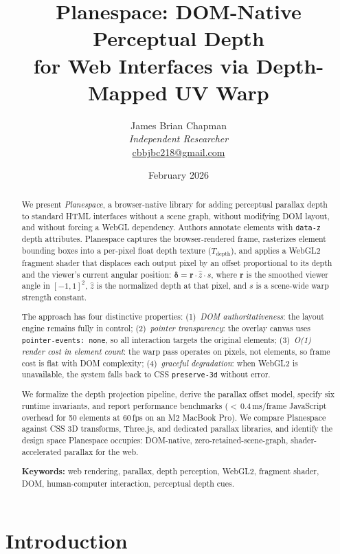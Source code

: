 \documentclass[10pt,twocolumn]{article}
\title{\textbf{Planespace: DOM-Native Perceptual Depth\\
for Web Interfaces via Depth-Mapped UV Warp}}
\author{
  James Brian Chapman\\
  \textit{Independent Researcher}\\
  \href{mailto:cbbjbc218@gmail.com}{cbbjbc218@gmail.com}
}
\date{February 2026}
\begin{document}
\maketitle

\begin{abstract}
We present \emph{Planespace}, a browser-native library for adding perceptual
parallax depth to standard HTML interfaces without a scene graph, without
modifying DOM layout, and without forcing a WebGL dependency.
Authors annotate elements with \texttt{data-z} depth attributes.
Planespace captures the browser-rendered frame, rasterizes element bounding
boxes into a per-pixel float depth texture ($T_{\mathrm{depth}}$), and applies
a WebGL2 fragment shader that displaces each output pixel by an offset
proportional to its depth and the viewer's current angular position:
$\boldsymbol{\delta} = \mathbf{r} \cdot \hat{z} \cdot s$, where
$\mathbf{r}$ is the smoothed viewer angle in $[-1,1]^2$, $\hat{z}$ is the
normalized depth at that pixel, and $s$ is a scene-wide warp strength constant.

The approach has four distinctive properties:
(1)~\emph{DOM authoritativeness}: the layout engine remains fully in control;
(2)~\emph{pointer transparency}: the overlay canvas uses
\texttt{pointer-events: none}, so all interaction targets the original elements;
(3)~\emph{O(1) render cost in element count}: the warp pass operates on pixels,
not elements, so frame cost is flat with DOM complexity;
(4)~\emph{graceful degradation}: when WebGL2 is unavailable, the system falls
back to CSS \texttt{preserve-3d} without error.

We formalize the depth projection pipeline, derive the parallax offset model,
specify six runtime invariants, and report performance benchmarks
($<$\,0.4\,ms/frame JavaScript overhead for 50 elements at 60\,fps on an M2
MacBook Pro). We compare Planespace against CSS 3D transforms, Three.js,
and dedicated parallax libraries, and identify the design space Planespace
occupies: DOM-native, zero-retained-scene-graph, shader-accelerated parallax
for the web.

\noindent\textbf{Keywords:} web rendering, parallax, depth perception,
WebGL2, fragment shader, DOM, human-computer interaction, perceptual depth cues.
\end{abstract}

\section{Introduction}
\label{sec:intro}
\end{document}
